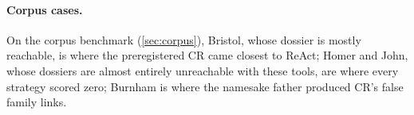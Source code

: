 \paragraph{Corpus cases.} On the corpus benchmark (\cref{sec:corpus}), Bristol, whose dossier is mostly reachable, is where the preregistered CR came closest to ReAct; Homer and John, whose dossiers are almost entirely unreachable with these tools, are where every strategy scored zero; Burnham is where the namesake father produced CR's false family links.

